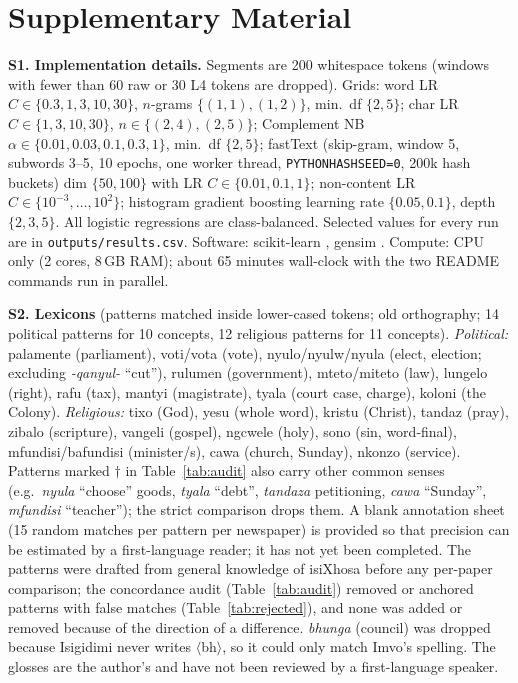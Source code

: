\documentclass[10pt,letterpaper]{article}
\newcommand{\grapheme}[1]{$\langle$#1$\rangle$}
\begin{document}
\clearpage
\onecolumn


\clearpage
\twocolumn
\section*{Supplementary Material}
\textbf{S1. Implementation details.} Segments are 200 whitespace tokens (windows with fewer than 60 raw or 30 L4 tokens are dropped). Grids: word LR $C\in\{0.3,1,3,10,30\}$, $n$-grams $\{(1,1),(1,2)\}$, min.\ df $\{2,5\}$; char LR $C\in\{1,3,10,30\}$, $n\in\{(2,4),(2,5)\}$; Complement NB $\alpha\in\{0.01,0.03,0.1,0.3,1\}$, min.\ df $\{2,5\}$; fastText (skip-gram, window 5, subwords 3--5, 10 epochs, one worker thread, \texttt{PYTHONHASHSEED=0}, 200k hash buckets) dim $\{50,100\}$ with LR $C\in\{0.01,0.1,1\}$; non-content LR $C\in\{10^{-3},\dots,10^{2}\}$; histogram gradient boosting learning rate $\{0.05,0.1\}$, depth $\{2,3,5\}$. All logistic regressions are class-balanced. Selected values for every run are in \texttt{outputs/results.csv}. Software: scikit-learn \citep{pedregosa2011scikit}, gensim \citep{rehurek2010software}. Compute: CPU only (2 cores, 8\,GB RAM); about 65 minutes wall-clock with the two README commands run in parallel.

\textbf{S2. Lexicons} (patterns matched inside lower-cased tokens; old orthography; 14 political patterns for 10 concepts, 12 religious patterns for 11 concepts). \emph{Political:} palamente (parliament), voti/vota (vote), nyulo/nyulw/nyula (elect, election; excluding \emph{-qanyul-} ``cut''), rulumen (government), mteto/miteto (law), lungelo (right), rafu (tax), mantyi (magistrate), tyala (court case, charge), koloni (the Colony). \emph{Religious:} tixo (God), yesu (whole word), kristu (Christ), tandaz (pray), zibalo (scripture), vangeli (gospel), ngcwele (holy), sono (sin, word-final), mfundisi/bafundisi (minister/s), cawa (church, Sunday), nkonzo (service). Patterns marked $\dagger$ in Table~\ref{tab:audit} also carry other common senses (e.g.\ \emph{nyula} ``choose'' goods, \emph{tyala} ``debt'', \emph{tandaza} petitioning, \emph{cawa} ``Sunday'', \emph{mfundisi} ``teacher''); the strict comparison drops them. A blank annotation sheet (15 random matches per pattern per newspaper) is provided so that precision can be estimated by a first-language reader; it has not yet been completed. The patterns were drafted from general knowledge of isiXhosa before any per-paper comparison; the concordance audit (Table~\ref{tab:audit}) removed or anchored patterns with false matches (Table~\ref{tab:rejected}), and none was added or removed because of the direction of a difference. \emph{bhunga} (council) was dropped because Isigidimi never writes \grapheme{bh}, so it could only match Imvo's spelling. The glosses are the author's and have not been reviewed by a first-language speaker.
\end{document}

